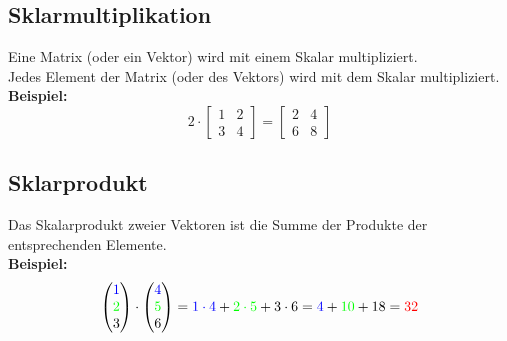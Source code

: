 \documentclass[12pt,a4paper]{article}
\begin{document}
\subsection{Sklarmultiplikation}
Eine Matrix (oder ein Vektor) wird mit einem Skalar multipliziert. \\
Jedes Element der Matrix (oder des Vektors) wird mit dem Skalar multipliziert. \\
\textbf{Beispiel:}
\[
2 \cdot
\begin{bmatrix}
1 & 2 \\
3 & 4
\end{bmatrix}
=
\begin{bmatrix}
2 & 4 \\
6 & 8
\end{bmatrix}
\]

\subsection{Sklarprodukt}
Das Skalarprodukt zweier Vektoren ist die Summe der Produkte der entsprechenden Elemente. \\
\textbf{Beispiel:}
\[
\begin{pmatrix}
\textcolor{blue}{1} \\
\textcolor{green}{2} \\
3
\end{pmatrix}
\cdot
\begin{pmatrix}
\textcolor{blue}{4} \\
\textcolor{green}{5} \\
6
\end{pmatrix}
=
\textcolor{blue}{1 \cdot 4} + \textcolor{green}{2 \cdot 5} + 3 \cdot 6
=
\textcolor{blue}{4} + \textcolor{green}{10} + 18
=
\textcolor{red}{32}
\]
\end{document}
